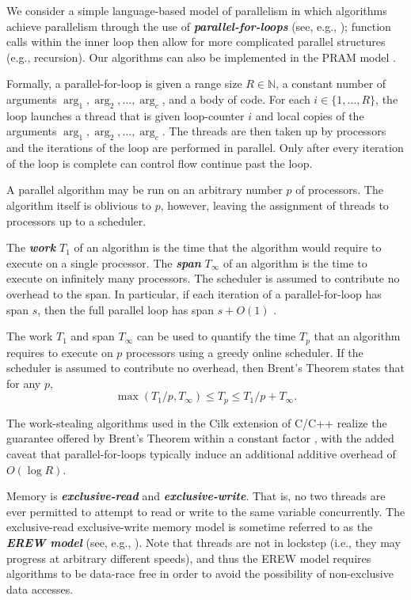 \documentclass[twoside,leqno,twocolumn]{article}
\newcommand{\defn}[1]{{\textit{\textbf{\boldmath #1}}}}
\renewcommand{\paragraph}[1]{\vspace{0.09in}\noindent{\bf \boldmath #1.}}
\begin{document}
\paragraph{Workflow Model} We consider a simple language-based model of
parallelism in which algorithms achieve parallelism through the use of
\defn{parallel-for-loops} (see, e.g.,
\cite{Blelloch96,AcarBl16,CLRS}); function calls within the inner loop
then allow for more complicated parallel structures (e.g., recursion). Our
algorithms can also be implemented in the PRAM model \cite{Blelloch96,
AcarBl16}.

Formally, a parallel-for-loop is given a range size $R \in \mathbb{N}$, a
constant number of arguments $\arg_1, \arg_2, \ldots, \arg_c$, and a
body of code. For each $i \in \{1, \ldots, R\}$, the loop launches a
thread that is given loop-counter $i$ and local copies of the
arguments $\arg_1, \arg_2, \ldots, \arg_c$. The threads are then taken up by
processors and the iterations of the loop are performed in parallel. Only after
every iteration of the loop is complete can control flow continue past the
loop.

A parallel algorithm may be run on an arbitrary number $p$ of
processors. The algorithm itself is oblivious to $p$, however, leaving
the assignment of threads to processors up to a scheduler.

The \defn{work} $T_1$ of an algorithm is the time that the algorithm
would require to execute on a single processor. The \defn{span}
$T_\infty$ of an algorithm is the time to execute on infinitely many
processors. The scheduler is assumed to contribute no overhead to the
span. In particular, if each iteration of a
parallel-for-loop has span $s$, then the full parallel loop has span
$s + O(1)$ \cite{Blelloch96,AcarBl16}.

The work $T_1$ and span $T_\infty$ can be used to quantify the time $T_p$
that an algorithm requires to execute on $p$ processors using a greedy
online scheduler. If the scheduler is assumed to contribute no
overhead, then Brent's Theorem \cite{Brent74} states that for any
$p$,
$$\max(T_1 / p, T_\infty) \le T_p \le T_1 / p + T_\infty.$$

The work-stealing algorithms used in the Cilk extension of C/C++ realize
the guarantee offered by Brent's Theorem within a constant factor
\cite{BlumofeJo96,BlumofeLe99}, with the added caveat that parallel-for-loops typically induce an additional additive overhead of $O(\log
R)$. 

\paragraph{Memory Model}
Memory is \defn{exclusive-read} and \defn{exclusive-write}. That is,
no two threads are ever permitted to attempt to read or write to the
same variable concurrently.  The exclusive-read exclusive-write memory
model is sometime referred to as the \defn{EREW model} (see, e.g.,
\cite{Hagerup89}). 
Note that threads are not in lockstep (i.e., they may progress at arbitrary
different speeds), and thus the EREW model requires algorithms to be data-race
free in order to avoid the possibility of non-exclusive data accesses.
\end{document}
